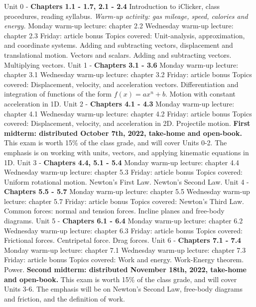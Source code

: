 \documentclass[10pt]{article}
\begin{document}
\begin{outline}[enumerate]
\1 Unit 0 - \textbf{Chapters 1.1 - 1.7, 2.1 - 2.4}
\2 Introduction to iClicker, class procedures, reading syllabus.
\2 \textit{Warm-up activity: gas mileage, speed, calories and energy.}
\2 Monday warm-up lecture: chapter 2.2
\2 Wednesday warm-up lecture: chapter 2.3
\2 Friday: article bonus
\2 Topics covered: 
\3 Unit-analysis, approximation, and coordinate systems.
\3 Adding and subtracting vectors, displacement and translational motion.
\3 Vectors and scalars.
\3 Adding and subtracting vectors.
\3 Multiplying vectors.
\1 Unit 1 - \textbf{Chapters 3.1 - 3.6}
\2 Monday warm-up lecture: chapter 3.1
\2 Wednesday warm-up lecture: chapter 3.2
\2 Friday: article bonus
\2 Topics covered:
\3 Displacement, velocity, and acceleration vectors.
\3 Differentiation and integration of functions of the form $f(x) = a x^n + b$.
\3 Motion with constant acceleration in 1D.
\1 Unit 2 - \textbf{Chapters 4.1 - 4.3}
\2 Monday warm-up lecture: chapter 4.1
\2 Wednesday warm-up lecture: chapter 4.2
\2 Friday: article bonus
\2 Topics covered:
\3 Displacement, velocity, and acceleration in 2D.
\3 Projectile motion.
\1 \textbf{First midterm: distributed October 7th, 2022, take-home and open-book.}  This exam is worth 15\% of the class grade, and will cover Units 0-2. The emphasis is on working with units, vectors, and applying kinematic equations in 1D.
\1 Unit 3 - \textbf{Chapters 4.4, 5.1 - 5.4}
\2 Monday warm-up lecture: chapter 4.4
\2 Wednesday warm-up lecture: chapter 5.3
\2 Friday: article bonus
\2 Topics covered:
\3 Uniform rotational motion.
\3 Newton's First Law.
\3 Newton's Second Law.
\1 Unit 4 - \textbf{Chapters 5.5 - 5.7}
\2 Monday warm-up lecture: chapter 5.5
\2 Wednesday warm-up lecture: chapter 5.7
\2 Friday: article bonus
\2 Topics covered:
\3 Newton's Third Law.
\3 Common forces: normal and tension forces.
\3 Incline planes and free-body diagrams.
\clearpage
\1 Unit 5 - \textbf{Chapters 6.1 - 6.4}
\2 Monday warm-up lecture: chapter 6.2
\2 Wednesday warm-up lecture: chapter 6.3
\2 Friday: article bonus
\2 Topics covered:
\3 Frictional forces.
\3 Centripetal force.
\3 Drag forces.
\1 Unit 6 - \textbf{Chapters 7.1 - 7.4}
\2 Monday warm-up lecture: chapter 7.1
\2 Wednesday warm-up lecture: chapter 7.3
\2 Friday: article bonus
\2 Topics covered:
\3 Work and energy.
\3 Work-Energy theorem.
\3 Power.
\1 \textbf{Second midterm: distributed November 18th, 2022, take-home and open-book.} This exam is worth 15\% of the class grade, and will cover Units 3-6. The emphasis will be on Newton's Second Law, free-body diagrams and friction, and the definition of work.

\end{outline}
\end{document}
